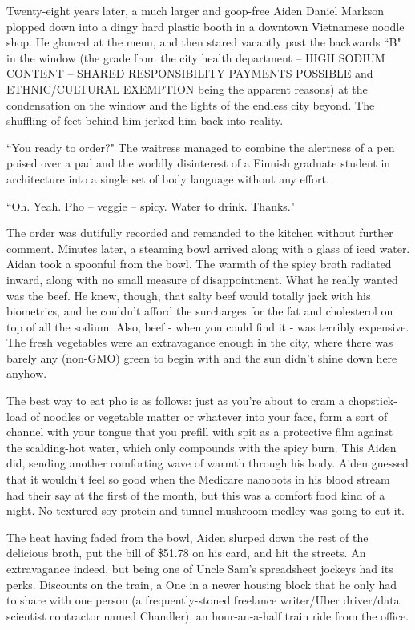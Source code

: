 \documentclass[11pt]{book}
\begin{document}
	Twenty-eight years later, a much larger and goop-free Aiden Daniel Markson plopped down into a dingy hard plastic booth in a downtown Vietnamese noodle shop. He glanced at the menu, and then stared vacantly past the backwards  ``B" in the window (the grade from the city health department – HIGH SODIUM CONTENT – SHARED RESPONSIBILITY PAYMENTS POSSIBLE and ETHNIC/CULTURAL EXEMPTION being the apparent reasons) at the condensation on the window and the lights of the endless city beyond. The shuffling of feet behind him jerked him back into reality.
	
	``You ready to order?" The waitress managed to combine the alertness of a pen poised over a pad and the worldly disinterest of a Finnish graduate student in architecture into a single set of body language without any effort.
	
	``Oh. Yeah. Pho – veggie – spicy. Water to drink. Thanks."
	
	The order was dutifully recorded and remanded to the kitchen without further comment. Minutes later, a steaming bowl arrived along with a glass of iced water. Aidan took a spoonful from the bowl. The warmth of the spicy broth radiated inward, along with no small measure of disappointment. What he really wanted was the beef. He knew, though, that salty beef would totally jack with his biometrics, and he couldn't afford the surcharges for the fat and cholesterol on top of all the sodium. Also, beef - when you could find it - was terribly expensive. The fresh vegetables were an extravagance enough in the city, where there was barely any (non-GMO) green to begin with and the sun didn't shine down here anyhow. 
	
	The best way to eat pho is as follows: just as you're about to cram a chopstick-load of noodles or vegetable matter or whatever into your face, form a sort of channel with your tongue that you prefill with spit as a protective film against the scalding-hot water, which only compounds with the spicy burn. This Aiden did, sending another comforting wave of warmth through his body. Aiden guessed that it wouldn't feel so good when the Medicare nanobots in his blood stream had their say at the first of the month, but this was a comfort food kind of a night. No textured-soy-protein and tunnel-mushroom medley was going to cut it.
	
	The heat having faded from the bowl, Aiden slurped down the rest of the delicious broth, put the bill of \$51.78 on his card, and hit the streets. An extravagance indeed, but being one of Uncle Sam’s spreadsheet jockeys had its perks. Discounts on the train, a One in a newer housing block that he only had to share with one person (a frequently-stoned freelance writer/Uber driver/data scientist contractor named Chandler), an hour-an-a-half train ride from the office.
	
\end{document}
